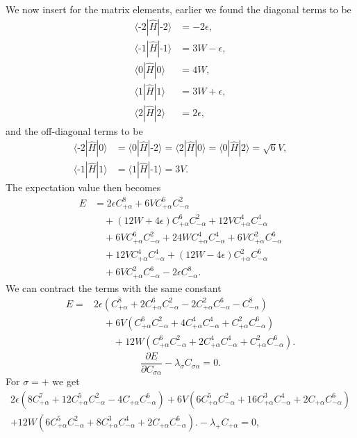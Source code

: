 \documentclass[a4paper, 11pt, notitlepage, english]{article}
\newcommand{\op}[1]{\hat{#1}}
\newcommand{\braopket}[3]{\langle #1 | {#2} | #3 \rangle}
\newcommand{\eps}{\epsilon}
\newcommand{\m}{\text{-}}
\newcommand{\p}{\partial}
\begin{document}
We now insert for the matrix elements, earlier we found the diagonal terms to be
\begin{align*}
\braopket{\m 2}{\op{H}}{\m 2} &= -2\eps, \\
\braopket{\m 1}{\op{H}}{\m 1} &= 3W-\eps,  \\
\braopket{0}{\op{H}}{0} &= 4W, \\
\braopket{1}{\op{H}}{1} &= 3W+\eps, \\
\braopket{2}{\op{H}}{2} &= 2\eps,
\end{align*}
and the off-diagonal terms to be
\begin{align*}
\braopket{\m 2}{\op{H}}{0} &= \braopket{0}{\op{H}}{\m 2} = \braopket{2}{\op{H}}{0} = \braopket{0}{\op{H}}{2} = \sqrt{6}V,\\
\braopket{\m 1}{\op{H}}{ 1} &= \braopket{1}{\op{H}}{\m 1} = 3V.
\end{align*}
The expectation value then becomes
\begin{align*}
E &=  
2\eps C_{+\alpha}^{8}
+ 6VC_{+\alpha}^{6}C_{-\alpha}^{2}  \\
&\quad+ (12W+4\eps)C_{+\alpha}^{6}C_{-\alpha}^{2} 
+ 12V C_{+\alpha}^{4}C_{-\alpha}^{4} \\ 
&\quad+ 6V C_{+\alpha}^{6}C_{-\alpha}^{2} 
+ 24W C_{+\alpha}^{4}C_{-\alpha}^{4}  
+ 6VC_{+\alpha}^{2}C_{-\alpha}^{6}  \\
&\quad+ 12V C_{+\alpha}^4 C_{-\alpha}^4  
+ (12W-4\eps) C_{+\alpha}^2 C_{-\alpha}^6  \\ 
&\quad+ 6V C_{+\alpha}^{2}C_{-\alpha}^{6}  
- 2\eps C_{-\alpha}^{8}.
\end{align*}
We can contract the terms with the same constant
\begin{align*}
E =  
&2\eps(C_{+\alpha}^{8} + 2C_{+\alpha}^{6}C_{-\alpha}^{2} - 2C_{+\alpha}^{2}C_{-\alpha}^{6} - C_{-\alpha}^{8}) \\
&\quad+ 6V(C_{+\alpha}^{6}C_{-\alpha}^{2} + 4C_{+\alpha}^{4}C_{-\alpha}^{4} +  C_{+\alpha}^{2}C_{-\alpha}^{6}) \\
&\qquad+ 12W(C_{+\alpha}^{6}C_{-\alpha}^{2} + 2C_{+\alpha}^{4}C_{-\alpha}^{4} +  C_{+\alpha}^{2}C_{-\alpha}^{6}).
\end{align*}
$$\frac{\p E}{\p C_{\sigma\alpha}} - \lambda_\sigma C_{\sigma\alpha} = 0.$$
For $\sigma=+$ we get
\begin{align*}
2\eps(8C_{+\alpha}^{7} + 12C_{+\alpha}^{5}C_{-\alpha}^{2} - 4C_{+\alpha}C_{-\alpha}^{6}) + 6V(6C_{+\alpha}^{5}C_{-\alpha}^{2} + 16C_{+\alpha}^{3}C_{-\alpha}^{4} +  2C_{+\alpha}C_{-\alpha}^{6}) \\
+ 12W(6C_{+\alpha}^{5}C_{-\alpha}^{2} + 8C_{+\alpha}^{3}C_{-\alpha}^{4} +  2C_{+\alpha}C_{-\alpha}^{6}).
 - \lambda_+ C_{+\alpha} = 0,
\end{align*}
\end{document}
